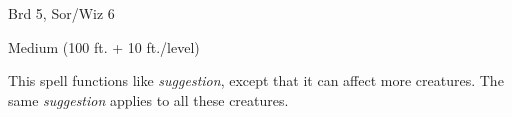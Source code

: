 
\begin{description*}
\item[Level:] Brd 5, Sor/Wiz 6
\item[Range:] Medium (100 ft. + 10 ft./level)
\end{description*}

This spell functions like \textit{suggestion}, except that it can affect more creatures.
The same \textit{suggestion} applies to all these creatures.